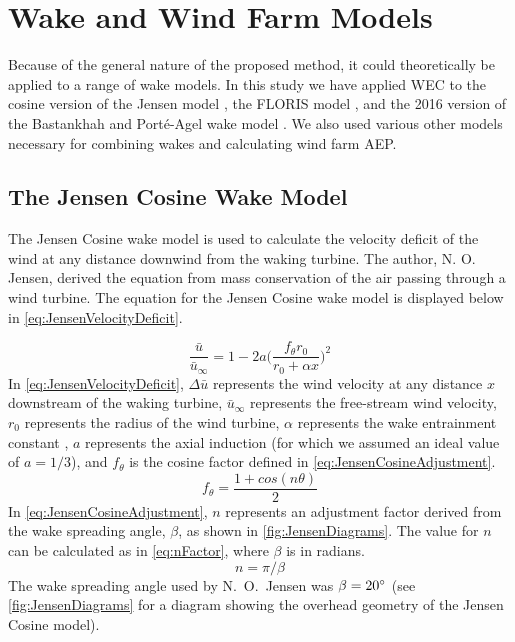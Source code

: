 \documentclass[a4paper]{jpconf}
\providecommand{\DIFaddend}{} %
\DeclareRobustCommand{\DIFaddend}{\DIFOaddend \let\includegraphics\DIFOincludegraphics} %
\begin{document}
\DIFaddend \section{Wake and Wind Farm Models}
Because of the general nature of the proposed method, it could theoretically be applied to a range of wake models. In this study we have applied WEC to the cosine version of the Jensen model \cite{jensen1983}, the FLORIS model \cite{gebraad2014,thomas2017-Improving-FLORIS}, and the 2016 version of the Bastankhah and Port\'e-Agel wake model \cite{bastankhah2016}. We also used various other models necessary for combining wakes and calculating wind farm AEP.

\subsection{The Jensen Cosine Wake Model}
The Jensen Cosine wake model is used to calculate the velocity deficit of the wind at any distance downwind from the waking turbine. The author, N. O. Jensen, derived the equation from mass conservation of the air passing through a wind turbine. The equation for the Jensen Cosine wake model is displayed below in \cref{eq:JensenVelocityDeficit}.

\begin{equation}
    \frac{ \bar{u}}{\bar{u}_\infty} = 1 - 2a \bigg(\frac{f_\theta r_0}{r_0 + \alpha x} \bigg)^2
    \label{eq:JensenVelocityDeficit}
\end{equation}
%
In \cref{eq:JensenVelocityDeficit}, $\Delta \bar{u}$ represents the wind velocity at any distance $x$ downstream of the waking turbine, $\bar{u}_\infty$ represents the free-stream wind velocity, $r_0$ represents the radius of the wind turbine, $\alpha$ represents the wake entrainment constant \cite{jensen1983}, $a$ represents the axial induction (for which we assumed an ideal value of $a = 1/3$), and $f_\theta$ is the cosine factor defined in \cref{eq:JensenCosineAdjustment}.
%
\begin{equation}
f_\theta = \frac{1 + cos(n\theta)}{2}
\label{eq:JensenCosineAdjustment}
\end{equation}
%
In \cref{eq:JensenCosineAdjustment}, $n$ represents an adjustment factor derived from the wake spreading angle, $\beta$, as shown in \cref{fig:JensenDiagrams}. The value for $n$ can be calculated as in \cref{eq:nFactor}, where $\beta$ is in radians.
%
\begin{equation}
n = \pi / \beta
\label{eq:nFactor}
\end{equation}
%
The wake spreading angle used by N.~O.~Jensen was $\beta = 20 \degree$  \cite{jensen1983} (see \cref{fig:JensenDiagrams} for a diagram showing the overhead geometry of the Jensen Cosine model).
\end{document}
